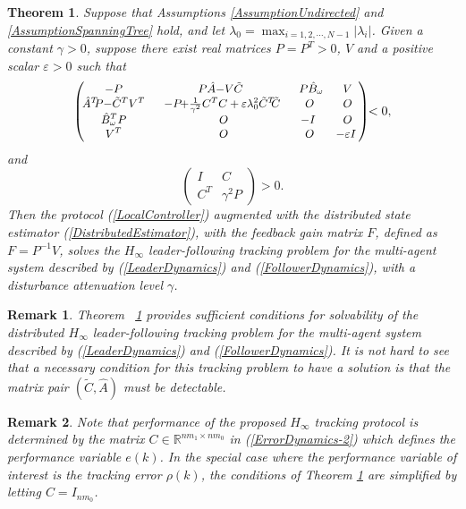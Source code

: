 \documentclass[a4paper,10pt,onecolumn]{article}
\newtheorem{remark}{Remark}
\newtheorem{theorem}{Theorem}
\begin{document}
 \begin{theorem}\label{MainTheorem2}
Suppose that Assumptions \ref{AssumptionUndirected} and
\ref{AssumptionSpanningTree} hold, and let
$\lambda_{0}=\max_{i=1,2,\cdots,N-1}|\lambda_{i}|$.
Given a constant $\gamma>0$, suppose
there exist real matrices $P=P^{T}>0$, $V$ and a
positive scalar $\varepsilon>0$ such  that
\begin{equation}\label{MainTheorem2FirstLMI}
\small{\left(\!\!\!\!\begin{array}{cccc}
-P\;\;&P\hat{A}{-}V\tilde{C}\;\;&\;P\hat{B}_{\omega}&\;V\\
\hat{A}^{T}\!\!P{-}\tilde{C}^{T}V^{T}\;\;&-P\!{+}\frac{1}{\gamma^2}C^{T}C+\varepsilon \lambda_{0}^{2}\tilde{C}^{T}\!\!\tilde{C}\;&O&\;O\\
\hat{B}_{\omega}^{T}P\;\;&O&-I\;&\;O\\
V^{T}\;\;&O&O&-\varepsilon I
\end{array}\!\!\right)\!\!<0,}
\end{equation}
and
\begin{equation}\label{MainTheorem2LMI2}
\left(\begin{array}{cc}
I & C\\
C^{T} & \gamma^{2}P
\end{array}
\right)>0.
\end{equation}
Then the protocol (\ref{LocalController}) augmented with the distributed
state estimator (\ref{DistributedEstimator}), with the feedback gain matrix
$F$, defined as $F=P^{-1}V$, solves the $H_{\infty}$
leader-following tracking problem for the multi-agent system described by
(\ref{LeaderDynamics}) and (\ref{FollowerDynamics}), with a disturbance
attenuation level $\gamma$.
\end{theorem}


\begin{remark}
Theorem~ \ref{MainTheorem2} provides sufficient conditions for
solvability of the distributed $H_{\infty}$ leader-following tracking
problem for the multi-agent system described by (\ref{LeaderDynamics}) and
(\ref{FollowerDynamics}). It is not hard to see that a necessary condition
for this tracking problem to have a solution is that the matrix
pair $(\tilde{C},\hat{A})$ must be detectable.
\end{remark}

\begin{remark}
Note that performance of the proposed $H_\infty$ tracking protocol is
determined by the matrix $C\in \mathbb{R}^{nm_{1}\times nm_{0}}$ in
(\ref{ErrorDynamics-2}) which defines the
performance variable $e(k)$. In the special case where the performance variable
of interest is the tracking error $\rho(k)$, the conditions of Theorem
\ref{MainTheorem2} are simplified by letting $C=I_{nm_{0}}$.
\end{remark}
\end{document}
